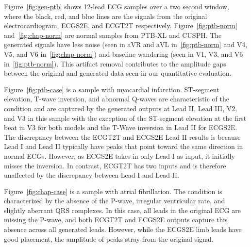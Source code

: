 Figure~\ref{fig:gen-ptb} shows 12-lead ECG samples over a two second window, where the black, red, and blue lines are the signals from the original electrocardiogram, ECGS2E, and ECGT2T respectively. Figure~\ref{fig:ptb-norm} and~\ref{fig:chap-norm} are normal samples from PTB-XL and CUSPH. The generated signals have less noise (seen in aVR and aVL in~\ref{fig:ptb-norm} and V4, V5, and V6 in~\ref{fig:chap-norm}) and baseline wandering (seen in V1, V3, and V6 in~\ref{fig:ptb-norm}). This artifact removal contributes to the amplitude gaps between the original and generated data seen in our quantitative evaluation.


Figure~\ref{fig:ptb-case} is a sample with myocardial infarction. ST-segment elevation, T-wave inversion, and abnormal Q-waves are characteristic of the condition and are captured by the generated outputs at Lead II, Lead III, V2, and V3 in this sample with the exception of the ST-segment elevation at the first beat in V3 for both models and the T-Wave inversion in Lead II for ECGS2E. The discrepancy between the ECGT2T and ECGS2E Lead II results is because Lead I and Lead II typically have peaks that point toward the same direction in normal ECGs. However, as ECGS2E takes in only Lead I as input, it initially misses the inversion. In contrast, ECGT2T has two inputs and is therefore unaffected by the discrepancy between Lead I and Lead II.

Figure~\ref{fig:chap-case} is a sample with atrial fibrillation. The condition is characterized by the absence of the P-wave, irregular ventricular rate, and slightly aberrant QRS complexes. In this case, all leads in the original ECG are missing the P-wave, and both ECGT2T and ECGS2E outputs capture this absence across all generated leads. However, while the ECGS2E limb leads have good placement, the amplitude of peaks  stray from the original signal. 

